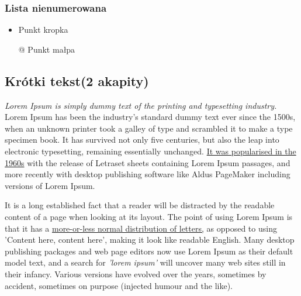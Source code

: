 \subsubsection{Lista nienumerowana}
\begin{itemize}
  \item Punkt kropka
  \item[@] Punkt małpa
\end{itemize}


\subsection{Krótki tekst(2 akapity)}


{\it Lorem Ipsum is simply dummy text of the printing and typesetting industry.} Lorem Ipsum has been the industry's standard dummy text ever since the 1500s, when an unknown printer took a galley of type and scrambled it to make a type specimen book. It has survived not only five centuries, but also the leap into electronic typesetting, remaining essentially unchanged. \underline{It was popularised in the 1960s} with the release of Letraset sheets containing Lorem Ipsum passages, and more recently with desktop publishing software like Aldus PageMaker including versions of Lorem Ipsum.
\vspace{1cm}

{}

It is a long established fact that a reader will be distracted by the readable content of a page when looking at its layout. The point of using Lorem Ipsum is that it has a \underline{more-or-less normal distribution of letters,} as opposed to using 'Content here, content here', making it look like readable English. Many desktop publishing packages and web page editors now use Lorem Ipsum as their default model text, and a search for {\it 'lorem ipsum'} will uncover many web sites still in their infancy. Various versions have evolved over the years, sometimes by accident, sometimes on purpose (injected humour and the like).